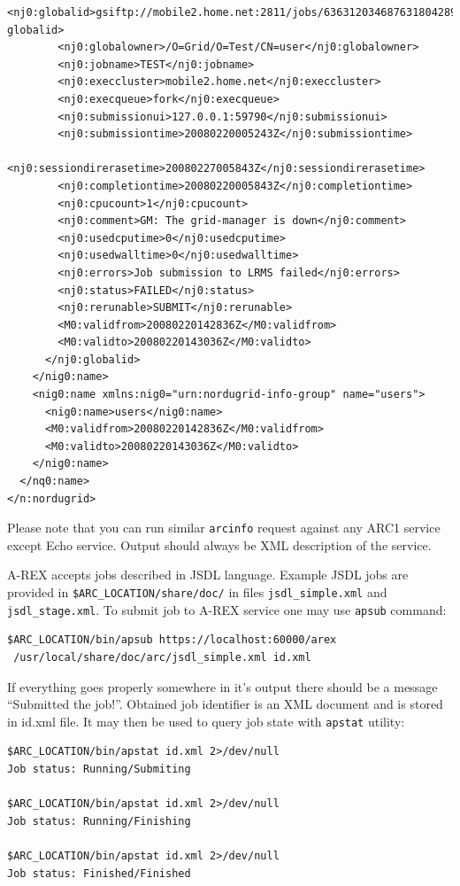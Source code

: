 \documentclass{article}                            %
\begin{document}
\begin{lstlisting}[caption={Example of a good arcinfo output},label=lst:arcinfo]
<nj0:globalid>gsiftp://mobile2.home.net:2811/jobs/636312034687631804289383</nj0:
globalid>
        <nj0:globalowner>/O=Grid/O=Test/CN=user</nj0:globalowner>
        <nj0:jobname>TEST</nj0:jobname>
        <nj0:execcluster>mobile2.home.net</nj0:execcluster>
        <nj0:execqueue>fork</nj0:execqueue>
        <nj0:submissionui>127.0.0.1:59790</nj0:submissionui>
        <nj0:submissiontime>20080220005243Z</nj0:submissiontime>
        <nj0:sessiondirerasetime>20080227005843Z</nj0:sessiondirerasetime>
        <nj0:completiontime>20080220005843Z</nj0:completiontime>
        <nj0:cpucount>1</nj0:cpucount>
        <nj0:comment>GM: The grid-manager is down</nj0:comment>
        <nj0:usedcputime>0</nj0:usedcputime>
        <nj0:usedwalltime>0</nj0:usedwalltime>
        <nj0:errors>Job submission to LRMS failed</nj0:errors>
        <nj0:status>FAILED</nj0:status>
        <nj0:rerunable>SUBMIT</nj0:rerunable>
        <M0:validfrom>20080220142836Z</M0:validfrom>
        <M0:validto>20080220143036Z</M0:validto>
      </nj0:globalid>
    </nig0:name>
    <nig0:name xmlns:nig0="urn:nordugrid-info-group" name="users">
      <nig0:name>users</nig0:name>
      <M0:validfrom>20080220142836Z</M0:validfrom>
      <M0:validto>20080220143036Z</M0:validto>
    </nig0:name>
  </nq0:name>
</n:nordugrid>
\end{lstlisting}

Please note that you can run similar \texttt{arcinfo} request against any ARC1
service except Echo service. Output should always be XML description of the service.

A-REX accepts jobs described in JSDL language. Example JSDL jobs are provided in
\verb|$ARC_LOCATION/share/doc/| in files \verb|jsdl_simple.xml| and
\verb|jsdl_stage.xml|. To submit job to A-REX service one may use
\texttt{apsub} command:

\begin{lstlisting}
$ARC_LOCATION/bin/apsub https://localhost:60000/arex
 /usr/local/share/doc/arc/jsdl_simple.xml id.xml
\end{lstlisting}

If everything goes properly somewhere in it's output there should be a message
``Submitted the job!''. Obtained job identifier is an XML document and is stored
in id.xml file. It may then be used to query job state with \texttt{apstat}
utility:

\begin{lstlisting}
$ARC_LOCATION/bin/apstat id.xml 2>/dev/null
Job status: Running/Submiting

$ARC_LOCATION/bin/apstat id.xml 2>/dev/null
Job status: Running/Finishing

$ARC_LOCATION/bin/apstat id.xml 2>/dev/null
Job status: Finished/Finished
\end{lstlisting}
\end{document}
